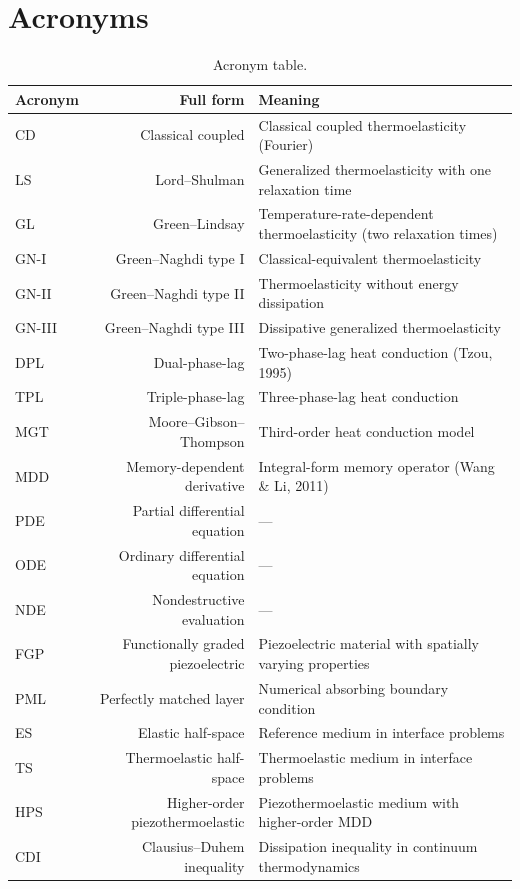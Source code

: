 \section*{Acronyms}

\begin{table}[h]
\centering
\small
\caption{Acronym table.}
\label{tab:acronyms}
\begin{tabularx}{\textwidth}{@{}lrX@{}}
\toprule
\textbf{Acronym} & \textbf{Full form} & \textbf{Meaning} \\
\midrule
CD & Classical coupled & Classical coupled thermoelasticity (Fourier) \\
LS & Lord--Shulman & Generalized thermoelasticity with one relaxation time \\
GL & Green--Lindsay & Temperature-rate-dependent thermoelasticity (two relaxation times) \\
GN-I & Green--Naghdi type I & Classical-equivalent thermoelasticity \\
GN-II & Green--Naghdi type II & Thermoelasticity without energy dissipation \\
GN-III & Green--Naghdi type III & Dissipative generalized thermoelasticity \\
DPL & Dual-phase-lag & Two-phase-lag heat conduction (Tzou, 1995) \\
TPL & Triple-phase-lag & Three-phase-lag heat conduction \\
MGT & Moore--Gibson--Thompson & Third-order heat conduction model \\
MDD & Memory-dependent derivative & Integral-form memory operator (Wang \& Li, 2011) \\
PDE & Partial differential equation & --- \\
ODE & Ordinary differential equation & --- \\
NDE & Nondestructive evaluation & --- \\
FGP & Functionally graded piezoelectric & Piezoelectric material with spatially varying properties \\
PML & Perfectly matched layer & Numerical absorbing boundary condition \\
ES & Elastic half-space & Reference medium in interface problems \\
TS & Thermoelastic half-space & Thermoelastic medium in interface problems \\
HPS & Higher-order piezothermoelastic & Piezothermoelastic medium with higher-order MDD \\
CDI & Clausius--Duhem inequality & Dissipation inequality in continuum thermodynamics \\
\bottomrule
\end{tabularx}
\end{table}
